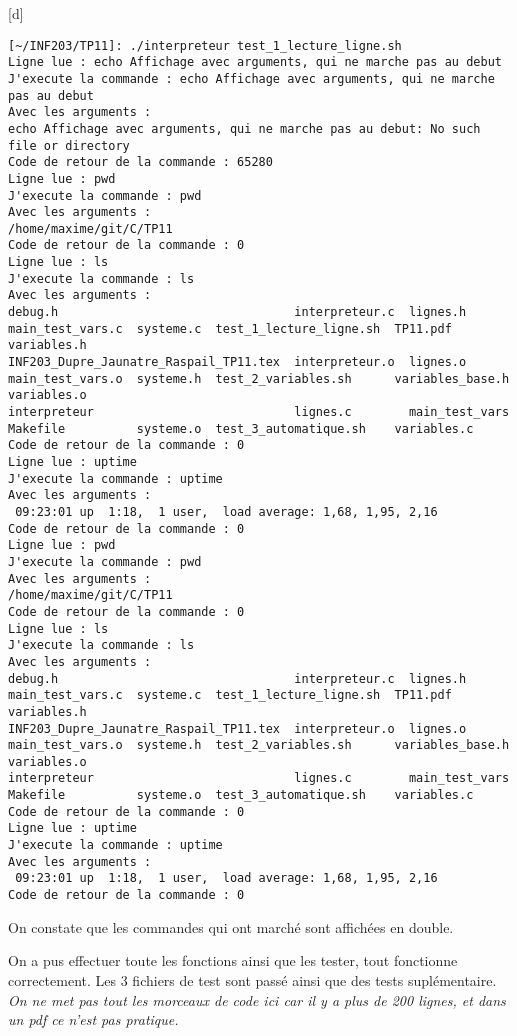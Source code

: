 \documentclass[12pt,a4paper,notitlepage,colorinlistoftodos]{article}
\begin{document}
[d]
\begin{lstlisting}[language = rshell]
[~/INF203/TP11]: ./interpreteur test_1_lecture_ligne.sh
Ligne lue : echo Affichage avec arguments, qui ne marche pas au debut
J'execute la commande : echo Affichage avec arguments, qui ne marche pas au debut
Avec les arguments :
echo Affichage avec arguments, qui ne marche pas au debut: No such file or directory
Code de retour de la commande : 65280
Ligne lue : pwd
J'execute la commande : pwd
Avec les arguments :
/home/maxime/git/C/TP11
Code de retour de la commande : 0
Ligne lue : ls
J'execute la commande : ls
Avec les arguments :
debug.h                                 interpreteur.c  lignes.h        main_test_vars.c  systeme.c  test_1_lecture_ligne.sh  TP11.pdf          variables.h
INF203_Dupre_Jaunatre_Raspail_TP11.tex  interpreteur.o  lignes.o        main_test_vars.o  systeme.h  test_2_variables.sh      variables_base.h  variables.o
interpreteur                            lignes.c        main_test_vars  Makefile          systeme.o  test_3_automatique.sh    variables.c
Code de retour de la commande : 0
Ligne lue : uptime
J'execute la commande : uptime
Avec les arguments :
 09:23:01 up  1:18,  1 user,  load average: 1,68, 1,95, 2,16
Code de retour de la commande : 0
Ligne lue : pwd
J'execute la commande : pwd
Avec les arguments :
/home/maxime/git/C/TP11
Code de retour de la commande : 0
Ligne lue : ls
J'execute la commande : ls
Avec les arguments :
debug.h                                 interpreteur.c  lignes.h        main_test_vars.c  systeme.c  test_1_lecture_ligne.sh  TP11.pdf          variables.h
INF203_Dupre_Jaunatre_Raspail_TP11.tex  interpreteur.o  lignes.o        main_test_vars.o  systeme.h  test_2_variables.sh      variables_base.h  variables.o
interpreteur                            lignes.c        main_test_vars  Makefile          systeme.o  test_3_automatique.sh    variables.c
Code de retour de la commande : 0
Ligne lue : uptime
J'execute la commande : uptime
Avec les arguments :
 09:23:01 up  1:18,  1 user,  load average: 1,68, 1,95, 2,16
Code de retour de la commande : 0
\end{lstlisting}

On constate que les commandes qui ont marché sont affichées en double.


On a pus effectuer toute les fonctions ainsi que les tester, tout fonctionne correctement. Les 3 fichiers de test sont passé
ainsi que des tests suplémentaire.
\textit{On ne met pas tout les morceaux de code ici car il y a plus de 200 lignes, et dans un pdf ce n'est pas pratique.}


\cite{}


\end{document}
